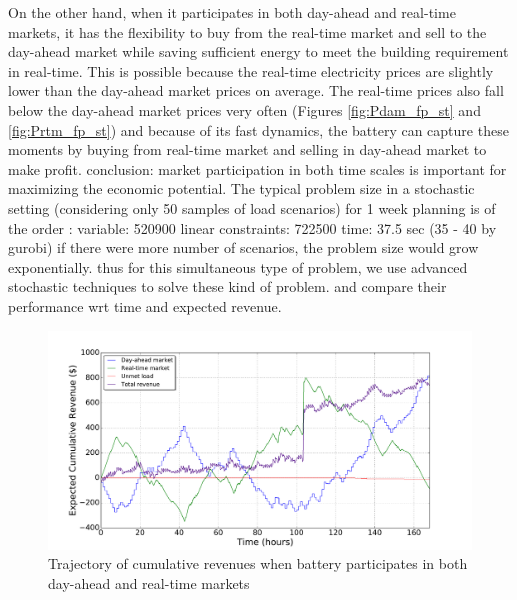 \documentclass[11pt,twoside]{article}
\begin{document}
On the other hand, when it participates in both day-ahead and real-time markets, it has the flexibility to buy from the real-time market and sell to the day-ahead market while saving sufficient energy to meet the building requirement in real-time. This is possible because the real-time electricity prices are slightly lower than the day-ahead market prices on average. The real-time prices also fall below the day-ahead market prices very often (Figures \ref{fig:Pdam_fp_st} and \ref{fig:Prtm_fp_st}) and because of its fast dynamics, the battery can capture these moments by buying from real-time market and selling in day-ahead market to make profit. 
conclusion: market participation in both time scales is important for maximizing the economic potential. The typical problem size in a stochastic setting (considering only 50 samples of load scenarios) for 1 week planning is of the order :
variable: 520900
linear constraints: 722500
time: 37.5 sec (35 - 40 by gurobi)
if there were more number of scenarios, the problem size would grow exponentially. thus for this simultaneous type of problem, we use advanced stochastic techniques to solve these kind of problem. and compare their performance wrt time and expected revenue.
\begin{figure}[h!]
\begin{center}
\includegraphics[scale=0.4]{Figures/Plots/fullproblem_stoch/cumulative_rev_fp_st.pdf} \caption{Trajectory of cumulative revenues when battery participates in both day-ahead and real-time markets}\label{fig:cumulative_rev_fp_st}\end{center}
\end{figure}
\end{document}
